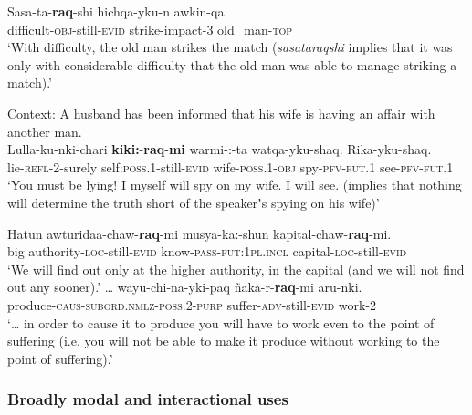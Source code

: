\begin{exe}
	\ex
	\gll Sasa-ta-\textbf{raq}-shi hichqa-yku-n awkin-qa.\\
	difficult-\textsc{obj}-still-\textsc{evid} strike-impact-3 old\_man-\textsc{top}\\
	\glt \lq With difficulty, the old man strikes the match (\textit{sasataraqshi} implies that it was only with considerable difficulty that the old man was able to manage striking a match).'  \parencite[389]{Weber1989}
	
	\ex\label{exAppendixQuechuaExtreme2}
	Context: A husband has been informed that his wife is having an affair with another man.\\
	\gll Lulla-ku-nki-chari \textbf{kiki:}-\textbf{raq}-\textbf{mi} warmi-:-ta watqa-yku-shaq. Rika-yku-shaq.\\
	lie-\textsc{refl}-2-surely self:\textsc{poss}.1-still-\textsc{evid} wife-\textsc{poss}.1-\textsc{obj} spy-\textsc{pfv}-\textsc{fut}.1 see-\textsc{pfv}-\textsc{fut}.1\\
	\glt \lq You must be lying! I myself will spy on my wife. I will see. (implies that nothing will determine the truth short of the speakerʼs spying on his wife)' \parencite[132, 389]{Weber1989}
	
	\ex\label{exAppendixQuechuaExtreme3}
	\gll Hatun awturidaa-chaw-\textbf{raq}-mi musya-ka:-shun kapital-chaw-\textbf{raq}-mi.\\
	big authority-\textsc{loc}-still-\textsc{evid} know-\textsc{pass}-\textsc{fut}:1\textsc{pl}.\textsc{incl} capital-\textsc{loc}-still-\textsc{evid}\\
	\glt \lq We will find out only at the higher authority, in the capital (and we will not find out any sooner).' \parencite[389]{Weber1989}
	\largerpage[2]
	\ex\label{exAppendixQuechuaExtreme4}
	\gll … wayu-chi-na-yki-paq ñaka-r-\textbf{raq}-mi aru-nki.\\
	{} produce-\textsc{caus}-\textsc{subord}.\textsc{nmlz}-\textsc{poss}.2-\textsc{purp} suffer-\textsc{adv}-still-\textsc{evid} work-2\\
	\glt \lq … in order to cause it to produce you will have to work even to the point of suffering (i.e. you will not be able to make it produce without working to the point of suffering).' \parencite[389]{Weber1989}
\end{exe}


\subsubsection{Broadly modal and interactional uses}
